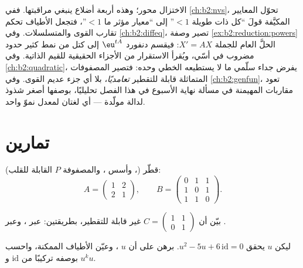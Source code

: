 \begin{remark}\label{rem:b2:reduction:perspectives}
الاختزال محور؛ وهذه أربعة أضلاع ينبغي مراقبتها. ففي
\cref{ch:b2:nvs}، تحوّل المعايير المكيَّفة قولَ ``كل  ذات
طويلة $< 1$'' إلى ``معيار مؤثر ما $< 1$''، فتجعل
الأطياف تحكم تقارب القوى والمتسلسلات. وفي
\cref{ch:b2:diffeq}، تصير وصفة
\cref{ex:b2:reduction:powers} الحلَّ العام للجملة
$X' = AX$: فيقسم دنفورد $\eu^{tA}$ إلى
كتل من نمط كثير حدود مضروب في أسّي، ويُقرأ الاستقرار
من الأجزاء الحقيقية للقيم الذاتية. وفي \cref{ch:b2:quadratic}، يفرض
جداء سلّمي ما لا يستطيعه  الخطي وحده: فتصير المصفوفات
المتماثلة قابلة للتقطير \emph{تعامديًا}، بلا أي جزء
عديم القوى. وفي \cref{ch:b2:genfun}، تعود مقاربات
 المهيمنة في مسألة نهاية الأسبوع في هذا
الفصل تحليليًا، بوصفها أصغر شذوذ لدالة
مولّدة --- أي لغتان لمعدل نموّ واحد.
\end{remark}

\section{تمارين}

\begin{exercise}[$\star$]\label{exo:b2:reduction:1}
قطّر (، وأسس ، والمصفوفة $P$ القابلة للقلب):
\[
A = \begin{pmatrix} 1 & 2\\ 2 & 1 \end{pmatrix},
\qquad
B = \begin{pmatrix} 0 & 1 & 1\\ 1 & 0 & 1\\ 1 & 1 & 0
\end{pmatrix}.
\]
\end{exercise}

\begin{exercise}[$\star$]\label{exo:b2:reduction:2}
بيّن أن $C = \begin{pmatrix} 1 & 1\\ 0 & 1\end{pmatrix}$ غير قابلة
للتقطير، بطريقتين: عبر ، وعبر .
\end{exercise}

\begin{exercise}[$\star$]\label{exo:b2:reduction:3}
ليكن $u$ يحقق $u^2 - 5u + 6\,\mathrm{id} = 0$. برهن على أن $u$
، وعيّن الأطياف الممكنة، واحسب $u^k$
بوصفه تركيبًا من $\mathrm{id}$ و$u$.
\end{exercise}


